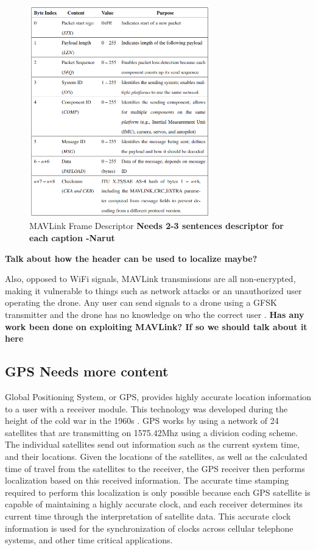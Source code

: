 \begin{figure}[ht]
\centering
\includegraphics[width=0.70\textwidth]{img/MAVLink-Packet-Table.PNG}
\caption{MAVLink Frame Descriptor \textbf{Needs 2-3 sentences descriptor for each caption -Narut}}
\label{fig:MAVlink_frame_table}
\end{figure}
\textbf{Talk about how the header can be used to localize maybe?} 
 \cite{mavlink_vuln}\par
Also, opposed to WiFi signals, MAVLink transmissions are all non-encrypted, making it vulnerable to things such as network attacks or an unauthorized user operating the drone. Any user can send signals to a drone using a GFSK transmitter and the drone has no knowledge on who the correct user \cite{MAVLink}. \textbf{Has any work been done on exploiting MAVLink? If so we should talk about it here}

\subsection{GPS \textbf{Needs more content}}
Global Positioning System, or GPS, provides highly accurate location information to a user with a receiver module. This technology was developed during the height of the cold war in the 1960s \cite{gps_info}. GPS works by using a network of 24 satellites that are transmitting on 1575.42Mhz using a division coding scheme. The individual satellites send out information such as the current system time, and their locations. Given the locations of the satellites, as well as the calculated time of travel from the satellites to the receiver, the GPS receiver then performs localization based on this received information. The accurate time stamping required to perform this localization is only possible because each GPS satellite is capable of maintaining a highly accurate clock, and each receiver determines its current time through the interpretation of satellite data. This accurate clock information is used for the synchronization of clocks across cellular telephone systems, and other time critical applications. \cite{GPS_Book}

